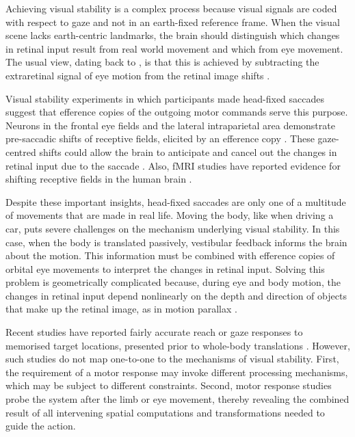 Achieving visual stability is a complex process because visual signals are coded with respect to gaze and not in an earth-fixed reference frame. When the visual scene lacks earth-centric landmarks, the brain should distinguish which changes in retinal input result from real world movement and which from eye movement. The usual view, dating back to \citeauthor{vonhelmholtz1867} \citeyear{vonhelmholtz1867}, is that this is achieved by subtracting the extraretinal signal of eye motion from the retinal image shifts \cite{wexler2005}.

Visual stability experiments in which participants made head-fixed saccades suggest that efference copies of the outgoing motor commands serve this purpose. Neurons in the frontal eye fields and the lateral intraparietal area demonstrate pre-saccadic shifts of receptive fields, elicited by an efference copy \cite{duhamel1992, kusunoki2003}. These gaze-centred shifts could allow the brain to anticipate and cancel out the changes in retinal input due to the saccade \cite{sommer2006}. Also, fMRI studies have reported evidence for shifting receptive fields in the human brain \cite{medendorp2003a}.

Despite these important insights, head-fixed saccades are only one of a multitude of movements that are made in real life. Moving the body, like when driving a car, puts severe challenges on the mechanism underlying visual stability. In this case, when the body is translated passively, vestibular feedback informs the brain about the motion. This information must be combined with efference copies of orbital eye movements to interpret the changes in retinal input. Solving this problem is geometrically complicated because, during eye and body motion, the changes in retinal input depend nonlinearly on the depth and direction of objects that make up the retinal image, as in motion parallax \cite{medendorp2003b}.

Recent studies have reported fairly accurate reach or gaze responses to memorised target locations, presented prior to whole-body translations \cite<see for review:>{klier2008, medendorp2011}. However, such studies do not map one-to-one to the mechanisms of visual stability. First, the requirement of a motor response may invoke different processing mechanisms, which may be subject to different constraints. Second, motor response studies probe the system after the limb or eye movement, thereby revealing the combined result of all intervening spatial computations and transformations needed to guide the action.


